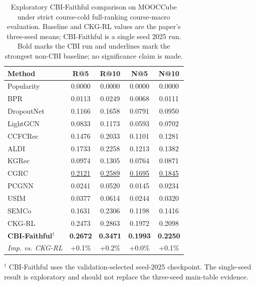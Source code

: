 \begin{table}[t]
\centering
{
\small
\setlength{\tabcolsep}{5.5pt}
\renewcommand{\arraystretch}{0.98}
\begin{tabular*}{\textwidth}{@{\extracolsep{\fill}}lcccc}
\toprule
Method & R@5 & R@10 & N@5 & N@10 \\
\midrule
Popularity & 0.0000 & 0.0000 & 0.0000 & 0.0000 \\
BPR & 0.0113 & 0.0249 & 0.0068 & 0.0111 \\
DropoutNet & 0.1166 & 0.1658 & 0.0791 & 0.0950 \\
LightGCN & 0.0833 & 0.1173 & 0.0593 & 0.0702 \\
CCFCRec & 0.1476 & 0.2033 & 0.1101 & 0.1281 \\
ALDI & 0.1733 & 0.2258 & 0.1213 & 0.1382 \\
KGRec & 0.0974 & 0.1305 & 0.0764 & 0.0871 \\
CGRC & \underline{0.2121} & \underline{0.2589} & \underline{0.1695} & \underline{0.1845} \\
PCGNN & 0.0241 & 0.0520 & 0.0145 & 0.0234 \\
USIM & 0.0377 & 0.0614 & 0.0244 & 0.0320 \\
SEMCo & 0.1631 & 0.2306 & 0.1198 & 0.1416 \\
CKG-RL & 0.2473 & 0.2863 & 0.1972 & 0.2098 \\
\textbf{CBI-Faithful}$^\dagger$ & \textbf{0.2672} & \textbf{0.3471} & \textbf{0.1993} & \textbf{0.2250} \\
\midrule
\emph{Imp. vs. CKG-RL} & +0.1\% & +0.2\% & +0.0\% & +0.1\% \\
\bottomrule
\end{tabular*}
}
\caption{Exploratory CBI-Faithful comparison on MOOCCube under strict course-cold full-ranking course-macro evaluation. Baseline and CKG-RL values are the paper's three-seed means; CBI-Faithful is a single seed 2025 run. Bold marks the CBI run and underlines mark the strongest non-CBI baseline; no significance claim is made.}
\label{tab:cbi-main-table-comparison}
\vspace{2pt}
\parbox{\textwidth}{\footnotesize $^\dagger$ CBI-Faithful uses the validation-selected seed-2025 checkpoint. The single-seed result is exploratory and should not replace the three-seed main-table evidence.}
\end{table}
